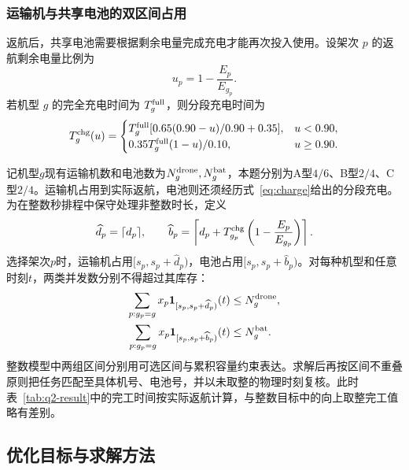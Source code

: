 \documentclass[bwprint,fontset=fandol]{gmcmthesis}
\begin{document}
\subsubsection{运输机与共享电池的双区间占用}

返航后，共享电池需要根据剩余电量完成充电才能再次投入使用。设架次 $p$ 的返航剩余电量比例为
\begin{equation}
u_p=1-\frac{E_p}{E_{g_p}}.
\end{equation}
若机型 $g$ 的完全充电时间为 $T_g^{\rm full}$，则分段充电时间为
\begin{equation}
T_g^{\rm chg}(u)=
\begin{cases}
T_g^{\rm full}[0.65(0.90-u)/0.90+0.35],&u<0.90,\\
0.35T_g^{\rm full}(1-u)/0.10,&u\geq0.90.
\end{cases}
\label{eq:charge}
\end{equation}

记机型$g$现有运输机数和电池数为$N_g^{\rm drone},N_g^{\rm bat}$，本题分别为A型$4/6$、B型$2/4$、C型$2/4$。运输机占用到实际返航，电池则还须经历式~\eqref{eq:charge}给出的分段充电。为在整数秒排程中保守处理非整数时长，定义
\begin{equation}
\widehat d_p=\lceil d_p\rceil,\qquad
\widehat b_p=\left\lceil d_p+T_{g_p}^{\rm chg}
\left(1-\frac{E_p}{E_{g_p}}\right)\right\rceil.
\label{eq:q2-reserved-length}
\end{equation}
选择架次$p$时，运输机占用$[s_p,s_p+\widehat d_p)$，电池占用$[s_p,s_p+\widehat b_p)$。对每种机型和任意时刻$t$，两类并发数分别不得超过其库存：
\begin{align}
\sum_{p:g_p=g}x_p\mathbf 1_{[s_p,s_p+\widehat d_p)}(t)
&\le N_g^{\rm drone},\\
\sum_{p:g_p=g}x_p\mathbf 1_{[s_p,s_p+\widehat b_p)}(t)
&\le N_g^{\rm bat}.
\label{eq:q2-cumulative}
\end{align}
整数模型中两组区间分别用可选区间与累积容量约束表达。求解后再按区间不重叠原则把任务匹配至具体机号、电池号，并以未取整的物理时刻复核。此时表~\ref{tab:q2-result}中的完工时间按实际返航计算，与整数目标中的向上取整完工值略有差别。

\subsection{优化目标与求解方法}
\end{document}
